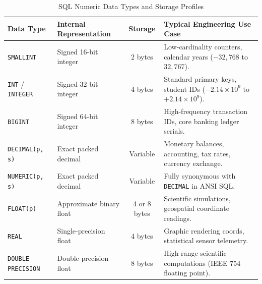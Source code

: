 \begin{table}[htbp]
\centering
\small
\caption{SQL Numeric Data Types and Storage Profiles}
\label{tab:sql_numeric_types}
\begin{tabularx}{\textwidth}{l p{3.2cm} c X}
\toprule
\textbf{Data Type} & \textbf{Internal Representation} & \textbf{Storage} & \textbf{Typical Engineering Use Case} \\
\midrule
\texttt{SMALLINT} & Signed 16-bit integer & 2 bytes & Low-cardinality counters, calendar years ($-32,768$ to $32,767$). \\
\texttt{INT} / \texttt{INTEGER} & Signed 32-bit integer & 4 bytes & Standard primary keys, student IDs ($-2.14 \times 10^9$ to $+2.14 \times 10^9$). \\
\texttt{BIGINT} & Signed 64-bit integer & 8 bytes & High-frequency transaction IDs, core banking ledger serials. \\
\texttt{DECIMAL(p, s)} & Exact packed decimal & Variable & Monetary balances, accounting, tax rates, currency exchange. \\
\texttt{NUMERIC(p, s)} & Exact packed decimal & Variable & Fully synonymous with \texttt{DECIMAL} in ANSI SQL. \\
\texttt{FLOAT(p)} & Approximate binary float & 4 or 8 bytes & Scientific simulations, geospatial coordinate readings. \\
\texttt{REAL} & Single-precision float & 4 bytes & Graphic rendering coords, statistical sensor telemetry. \\
\texttt{DOUBLE PRECISION} & Double-precision float & 8 bytes & High-range scientific computations (IEEE 754 floating point). \\
\bottomrule
\end{tabularx}
\end{table}

